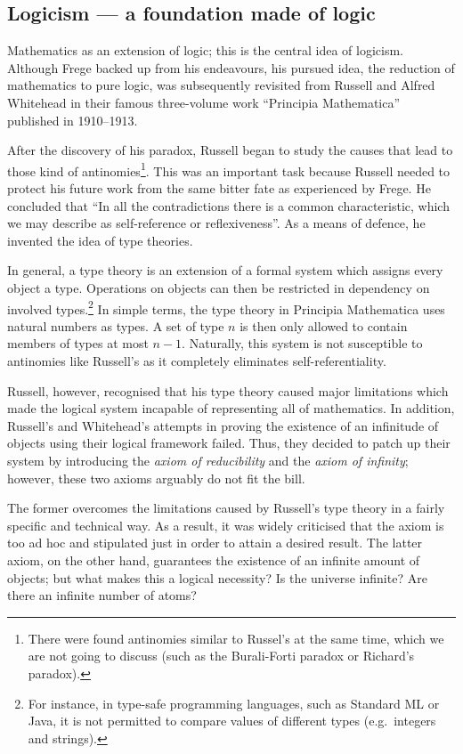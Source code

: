 \documentclass[hidelinks]{article}
\begin{document}
\subsection{Logicism --- a foundation made of logic}\label{ssec_logicism}
Mathematics as an extension of logic; this is the central idea of logicism. Although Frege backed up from his endeavours, his pursued idea, the reduction of mathematics to pure logic, was subsequently revisited from Russell and Alfred Whitehead in their famous three-volume work ``Principia Mathematica'' published in 1910--1913.

After the discovery of his paradox, Russell began to study the causes that lead to those kind of antinomies\footnote{There were found antinomies similar to Russel's at the same time, which we are not going to discuss (such as the Burali-Forti paradox or Richard's paradox).\cite{russell_self_referentiality}}. This was an important task because Russell needed to protect his future work from the same bitter fate as experienced by Frege. He concluded that ``In all the contradictions there is a common characteristic, which we may describe as self-reference or reflexiveness''\cite[p. 224]{russell_self_referentiality}. As a means of defence, he invented the idea of type theories. 

In general, a type theory is an extension of a formal system which assigns every object a type. Operations on objects can then be restricted in dependency on involved types.\footnote{For instance, in type-safe programming languages, such as Standard ML or Java, it is not permitted to compare values of different types (e.g.\ integers and strings).} In simple terms, the type theory in Principia Mathematica uses natural numbers as types. A set of type $n$ is then only allowed to contain members of types at most $n-1$. Naturally, this system is not susceptible to antinomies like Russell's as it completely eliminates self-referentiality. 

Russell, however, recognised that his type theory caused major limitations which made the logical system incapable of representing all of mathematics. In addition, Russell's and Whitehead's attempts in proving the existence of an infinitude of objects using their logical framework failed. Thus, they decided to patch up their system by introducing the \textit{axiom of reducibility} and the \textit{axiom of infinity}; however, these two axioms arguably do not fit the bill.

The former overcomes the limitations caused by Russell's type theory in a fairly specific and technical way. As a result, it was widely criticised that the axiom is too ad hoc and stipulated just in order to attain a desired result.
The latter axiom, on the other hand, guarantees the existence of an infinite amount of objects; but what makes this a logical necessity? Is the universe infinite? Are there an infinite number of atoms?
\end{document}
